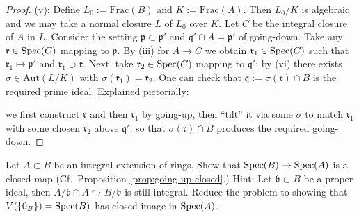 \begin{proof}
	(v): Define $L_0 := \text{Frac}(B)$ and $K := \text{Frac}(A)$. Then $L_0/K$ is algebraic and we may take a normal closure $L$ of $L_0$ over $K$. Let $C$ be the integral closure of $A$ in $L$. Consider the setting $\mathfrak{p} \subset \mathfrak{p}'$ and $\mathfrak{q}' \cap A = \mathfrak{p}'$ of going-down. Take any $\mathfrak{r} \in \operatorname{Spec}(C)$ mapping to $\mathfrak{p}$. By (iii) for $A \to C$ we obtain $\mathfrak{r}_1 \in \operatorname{Spec}(C)$ such that $\mathfrak{r}_1 \mapsto \mathfrak{p}'$ and $\mathfrak{r}_1 \supset \mathfrak{r}$. Next, take $\mathfrak{r}_2 \in \operatorname{Spec}(C)$ mapping to $\mathfrak{q}'$; by (vi) there exists $\sigma \in \text{Aut}(L/K)$ with $\sigma(\mathfrak{r}_1) = \mathfrak{r}_2$. One can check that $\mathfrak{q} := \sigma(\mathfrak{r}) \cap B$ is the required prime ideal. Explained pictorially:
	\begin{center}\end{center}
	we first construct $\mathfrak{r}$ and then $\mathfrak{r}_1$ by going-up, then ``tilt'' it via some $\sigma$ to match $\mathfrak{r}_1$ with some chosen $\mathfrak{r}_2$ above $\mathfrak{q}'$, so that $\sigma(\mathfrak{r}) \cap B$ produces the required going-down.
\end{proof}

\begin{exercise}\label{exo:integral-closed}
	Let $A \subset B$ be an integral extension of rings. Show that $\operatorname{Spec}(B) \to \operatorname{Spec}(A)$ is a closed map (Cf.\ Proposition \ref{prop:going-up-closed}.) Hint: Let $\mathfrak{b} \subset B$ be a proper ideal, then $A/\mathfrak{b} \cap A \hookrightarrow B/\mathfrak{b}$ is still integral. Reduce the problem to showing that $V(\{0_B\}) = \operatorname{Spec}(B)$ has closed image in $\operatorname{Spec}(A)$.
\end{exercise}

